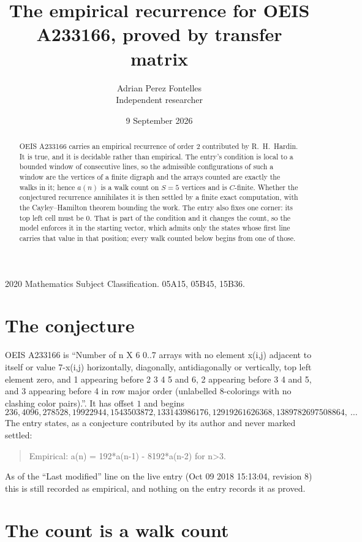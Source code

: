 \documentclass[11pt,a4paper]{article}
\title{The empirical recurrence for OEIS A233166, proved by transfer matrix}
\author{Adrian Perez Fontelles\\ \small Independent researcher}
\date{9 September 2026}
\theoremstyle{plain}
\theoremstyle{definition}
\begin{document}
\maketitle

\begin{abstract}
OEIS A233166 carries an empirical recurrence of order $2$ contributed by R.~H.~Hardin. It is
true, and it is decidable rather than empirical. The entry's condition is local to a bounded window of consecutive lines, so
the admissible configurations of such a window are the vertices of a finite digraph and the
arrays counted are exactly the walks in it; hence $a(n)$ is a walk count on $S=5$ vertices
and is $C$-finite. Whether the conjectured recurrence annihilates it is then settled by a
finite exact computation, with the Cayley--Hamilton theorem bounding the work.
 The entry also fixes one corner: its top left cell must be $0$. That is part of the condition and it changes the count, so the model enforces it in the starting vector, which admits only the states whose first line carries that value in that position; every walk counted below begins from one of those.\end{abstract}

\noindent\small 2020 Mathematics Subject Classification. 05A15, 05B45, 15B36.\normalsize

\section{The conjecture}

OEIS A233166 is ``Number of n X 6 0..7 arrays with no element x(i,j) adjacent to itself or value 7-x(i,j) horizontally, diagonally, antidiagonally or vertically, top left element zero, and 1 appearing before 2 3 4 5 and 6, 2 appearing before 3 4 and 5, and 3 appearing before 4 in row major order (unlabelled 8-colorings with no clashing color pairs).''. It has offset $1$ and begins
\[
236, 4096, 278528, 19922944, 1543503872, 133143986176, 12919261626368, 1389782697508864,\ \dots
\]
The entry states, as a conjecture contributed by its author and never marked settled:
\begin{quote}
Empirical: a(n) = 192*a(n-1) - 8192*a(n-2) for n>3.
\end{quote}
As of the ``Last modified'' line on the live entry (Oct 09 2018 15:13:04, revision 8) this is still
recorded as empirical, and nothing on the entry records it as proved.

\section{The count is a walk count}
\end{document}
